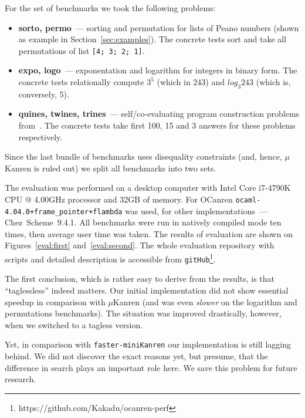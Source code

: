 For the set of benchmarks we took the following problems:

\begin{itemize}
\item \textbf{sorto, permo}~--- sorting and permutation for lists of Peano numbers (shown as example in Section~\ref{sec:examples}).
The concrete tests sort and take all permutations of list \lstinline{[4; 3; 2; 1]}.
\item \textbf{expo, logo}~--- exponentation and logarithm for integers in binary form. The concrete tests relationally compute
$3^5$ (which in 243) and $log_3 243$ (which is, conversely, 5).
\item \textbf{quines, twines, trines}~--- self/co-evaluating program construction problems from~\cite{Untagged}. The
concrete tests take first 100, 15 and 3 answers for these problems respectively.
\end{itemize}

Since the last bundle of benchmarks uses disequality constraints (and, hence, $\mu$Kanren is ruled out) we
split all benchmarks into two sets. 

The evaluation was performed on a desktop computer with Intel Core i7-4790K CPU @ 4.00GHz processor and 32GB of memory.
For OCanren \mbox{\texttt{ocaml-4.04.0+frame_pointer+flambda}} was used, for other implementations~--- Chez~Scheme~9.4.1. 
All benchmarks were run in natively compiled mode ten times, then average user time was taken. The results of evaluation
are shown on Figures~\ref{eval:first} and~\ref{eval:second}. The whole evaluation repository with scripts and detailed
description is accessible from \lstinline{gitHub}\footnote{https://github.com/Kakadu/ocanren-perf}.

The first conclusion, which is rather easy to derive from the results, is that ``taglessless'' indeed matters. Our initial
implementation did not show essential speedup in comparison with $\mu$Kanren (and was even \emph{slower} on the logarithm 
and permutations benchmarks). The situation was improved drastically, however, when we switched to a tagless version.

Yet, in comparison with \texttt{faster-miniKanren} our implementation is still lagging behind. We did not discover the exact
reasons yet, but presume, that the difference in search plays an important role here. 
We save this problem for future research.
